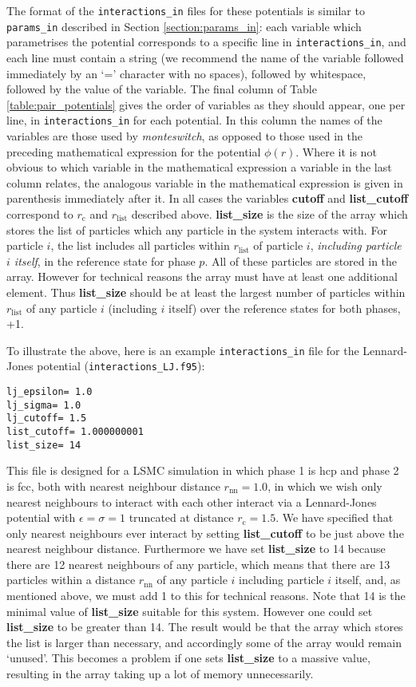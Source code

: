\documentclass{report}
\begin{document}
The format of the \texttt{interactions\_in} files for these potentials is similar to \texttt{params\_in} described in Section \ref{section:params_in}:
each variable which parametrises the potential corresponds to a specific line in \texttt{interactions\_in}, and each line must contain a string
(we recommend the name of the variable followed immediately by an `=' character with no spaces), followed by whitespace, followed by the value
of the variable. The final column of Table \ref{table:pair_potentials} gives the order of variables as they should appear, one per line, in
\texttt{interactions\_in} for each potential. In this column the names of the variables are those used by \emph{monteswitch}, as opposed to those
used in the preceding mathematical expression for the potential $\phi(r)$. Where it is not obvious to which variable in the mathematical expression
a variable in the last column relates, the analogous variable in the mathematical expression is given in parenthesis immediately after it. In all
cases the variables \textbf{cutoff} and \textbf{list\_cutoff} correspond to $r_{\text{c}}$ and $r_{\text{list}}$ described above. 
%
\textbf{list\_size} is the size of the array which stores the list of particles which any particle in the system interacts with. For particle $i$,
the list includes all particles within $r_{\text{list}}$ of particle $i$, \emph{including particle $i$ itself}, in the reference state for phase $p$. All
of these particles are stored in the array. However for technical reasons the array must have at least one additional element. Thus
\textbf{list\_size} should be at least the largest number of particles within $r_{\text{list}}$ of any particle $i$ (including $i$ itself) over the
reference states for both phases, +1. 

To illustrate the above, here is an example \texttt{interactions\_in} file for the Lennard-Jones potential (\texttt{interactions\_LJ.f95}):
\begin{verbatim}
lj_epsilon= 1.0
lj_sigma= 1.0
lj_cutoff= 1.5
list_cutoff= 1.000000001
list_size= 14
\end{verbatim}
This file is designed for a LSMC simulation in which phase 1 is hcp and phase 2 is fcc, both with nearest neighbour distance $r_{\text{nn}}=1.0$, in
which we wish only nearest neighbours to interact with each other interact via a Lennard-Jones potential with $\epsilon=\sigma=1$ truncated at
distance $r_{\text{c}}=1.5$. We have specified that only nearest neighbours ever interact by setting \textbf{list\_cutoff} to be just above 
the nearest neighbour distance. Furthermore we have set \textbf{list\_size} to 14 because there are 12 nearest neighbours of any particle, 
which means that there are 13 particles within a distance $r_{\text{nn}}$ of any particle $i$ including particle $i$ itself, and, as mentioned above, 
we must add 1 to this for technical reasons. 
Note that 14 is the minimal value of \textbf{list\_size} suitable for this system. However one could set \textbf{list\_size} 
to be greater than 14. The result would be that the array which stores the list is larger than necessary, and accordingly some of the array would
remain `unused'. This becomes a problem if one sets \textbf{list\_size} to a massive value, resulting in the array taking up a lot of memory
unnecessarily.
\end{document}
